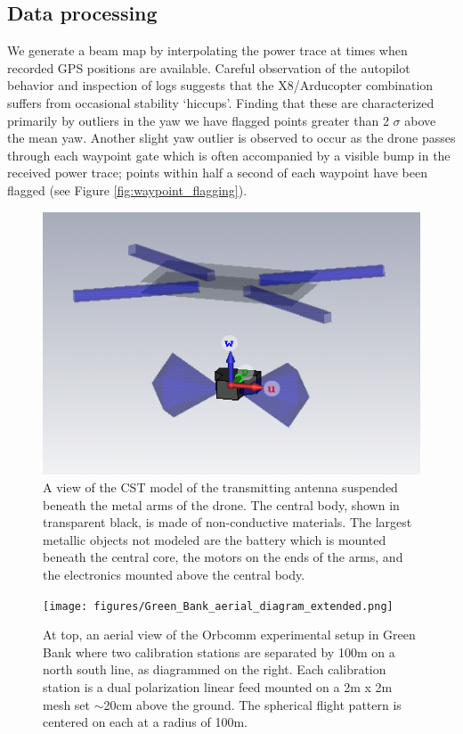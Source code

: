 \documentclass[preprint2,numberedappendix,tighten,twocolappendix]{aastex6}
\begin{document}
\subsection{Data processing}
\label{sec:processing}
We generate a beam map by interpolating the power trace at times when recorded GPS positions are available.  Careful observation of the autopilot behavior and inspection of logs suggests that the X8/Arducopter combination suffers from occasional stability `hiccups'. Finding that these are characterized primarily by outliers in the yaw we have flagged points greater than 2 $\sigma$ above the mean yaw.  Another slight yaw outlier is observed to occur as the drone passes through each waypoint gate which is often accompanied by a visible bump in the received power trace; points within half a second of each waypoint have been flagged (see Figure \ref{fig:waypoint_flagging}).

\begin{figure}
\includegraphics[width=\columnwidth]{figures/drone_antenna_screenshot.png}
\caption{A view of the CST model of the transmitting antenna suspended beneath the metal arms of the drone. The central body, shown in transparent black, is made of non-conductive materials. The largest metallic objects not modeled are the battery which is mounted beneath the central core, the motors on the ends of the arms, and the electronics mounted above the central body.}\label{fig:tx_cst}
\end{figure}




\begin{figure}
\begin{center}
\texttt{[image: figures/Green\_Bank\_aerial\_diagram\_extended.png]}
\caption{At top, an aerial view of the Orbcomm experimental setup in Green Bank where two calibration stations are separated by 100m on a north south line, as diagrammed on the right. Each calibration station is a dual polarization linear feed mounted on a 2m x 2m mesh set $\sim$20cm above the ground. The spherical flight pattern is centered on each at a radius of 100m.}
\label{fig:GB_aerial}
\end{center}
\end{figure}
\end{document}
